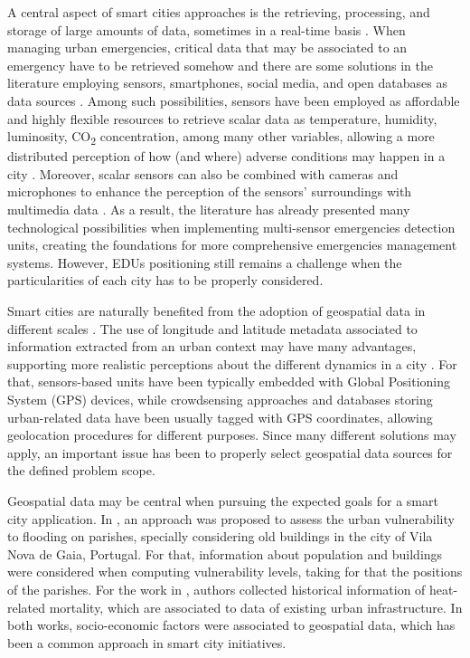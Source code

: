 \begin{refsection}
A central aspect of smart cities approaches is the retrieving, processing, and storage of large amounts of data, sometimes in a real-time basis \cite{surveycity1}. When managing urban emergencies, critical data that may be associated to an emergency have to be retrieved somehow and there are some solutions in the literature employing sensors, smartphones, social media, and open databases as data sources \cite{surveycity2,emergencies1}. Among such possibilities, sensors have been employed as affordable and highly flexible resources to retrieve scalar data as temperature, humidity, luminosity, CO\textsubscript{2} concentration, among many other variables, allowing a more distributed perception of how (and where) adverse conditions may happen in a city \cite{multiSensor,surveyEmergencies2}. Moreover, scalar sensors can also be combined with cameras and microphones to enhance the perception of the sensors' surroundings with multimedia data \cite{smartcitiescameras}. As a result, the literature has already presented many technological possibilities when implementing multi-sensor emergencies detection units, creating the foundations for more comprehensive emergencies management systems. However, EDUs positioning still remains a challenge when the particularities of each city has to be properly considered.

Smart cities are naturally benefited from the adoption of geospatial data in different scales \cite{sharingservices}. The use of longitude and latitude metadata associated to information extracted from an urban context may have many advantages, supporting more realistic perceptions about the different dynamics in a city \cite{surveygps}. For that, sensors-based units have been typically embedded with Global Positioning System (GPS) devices, while crowdsensing approaches and databases storing urban-related data have been usually tagged with GPS coordinates, allowing geolocation procedures for different purposes. Since many different solutions may apply, an important issue has been to properly select geospatial data sources for the defined problem scope.

Geospatial data may be central when pursuing the expected goals for a smart city application. In \cite{Fernandez_2015}, an approach was proposed to assess the urban vulnerability to flooding on parishes, specially considering old buildings in the city of Vila Nova de Gaia, Portugal. For that, information about population and buildings were considered when computing vulnerability levels, taking for that the positions of the parishes. For the work in \cite{Hondula_2015}, authors collected historical information of heat-related mortality, which are associated to data of existing urban infrastructure. In both works, socio-economic factors were associated to geospatial data, which has been a common approach in smart city initiatives.


\end{refsection}
